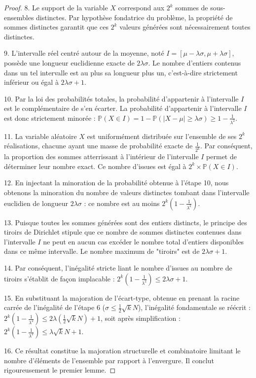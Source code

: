 \documentclass[11pt,a4paper]{article}
\begin{document}
\begin{proof}
8. Le support de la variable $X$ correspond aux $2^k$ sommes de sous-ensembles distinctes. Par hypothèse fondatrice du problème, la propriété de sommes distinctes garantit que ces $2^k$ valeurs générées sont nécessairement toutes distinctes.

9. L'intervalle réel centré autour de la moyenne, noté $I = [\mu - \lambda \sigma, \mu + \lambda \sigma]$, possède une longueur euclidienne exacte de $2 \lambda \sigma$. Le nombre d'entiers contenus dans un tel intervalle est au plus sa longueur plus un, c'est-à-dire strictement inférieur ou égal à $2 \lambda \sigma + 1$.

10. Par la loi des probabilités totales, la probabilité d'appartenir à l'intervalle $I$ est le complémentaire de s'en écarter. La probabilité d'appartenir à l'intervalle $I$ est donc strictement minorée : $\mathbb{P}(X \in I) = 1 - \mathbb{P}(|X - \mu| \ge \lambda \sigma) \ge 1 - \frac{1}{\lambda^2}$.

11. La variable aléatoire $X$ est uniformément distribuée sur l'ensemble de ses $2^k$ réalisations, chacune ayant une masse de probabilité exacte de $\frac{1}{2^k}$. Par conséquent, la proportion des sommes atterrissant à l'intérieur de l'intervalle $I$ permet de déterminer leur nombre exact. Ce nombre d'issues est égal à $2^k \times \mathbb{P}(X \in I)$.

12. En injectant la minoration de la probabilité obtenue à l'étape 10, nous obtenons la minoration du nombre de valeurs distinctes tombant dans l'intervalle euclidien de longueur $2 \lambda \sigma$ : ce nombre est au moins $2^k (1 - \frac{1}{\lambda^2})$.

13. Puisque toutes les sommes générées sont des entiers distincts, le principe des tiroirs de Dirichlet stipule que ce nombre de sommes distinctes contenues dans l'intervalle $I$ ne peut en aucun cas excéder le nombre total d'entiers disponibles dans ce même intervalle. Le nombre maximum de "tiroirs" est de $2 \lambda \sigma + 1$.

14. Par conséquent, l'inégalité stricte liant le nombre d'issues au nombre de tiroirs s'établit de façon implacable : $2^k \left(1 - \frac{1}{\lambda^2}\right) \le 2 \lambda \sigma + 1$.

15. En substituant la majoration de l'écart-type, obtenue en prenant la racine carrée de l'inégalité de l'étape 6 ($\sigma \le \frac{1}{2} \sqrt{k} N$), l'inégalité fondamentale se réécrit : $2^k \left(1 - \frac{1}{\lambda^2}\right) \le 2 \lambda \left(\frac{1}{2} \sqrt{k} N\right) + 1$, soit après simplification : $2^k \left(1 - \frac{1}{\lambda^2}\right) \le \lambda \sqrt{k} N + 1$.

16. Ce résultat constitue la majoration structurelle et combinatoire limitant le nombre d'éléments de l'ensemble par rapport à l'envergure. Il conclut rigoureusement le premier lemme.
\end{proof}
\end{document}
